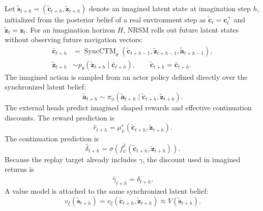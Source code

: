 \documentclass{article}
\begin{document}
Let $\tilde{\mathbf s}_{t+h}=(\tilde{\mathbf c}_{t+h},\tilde{\mathbf z}_{t+h})$ denote an imagined latent state at imagination step $h$, initialized from the posterior belief of a real environment step as $\tilde{\mathbf c}_{t}=\mathbf c_t^+$ and $\tilde{\mathbf z}_{t}=\mathbf z_t$. For an imagination horizon $H$, NRSM rolls out future latent states without observing future navigation vectors:
\begin{align}
\bar{\mathbf c}_{t+h}
&=
\operatorname{SyncCTM}_{\theta}(
\tilde{\mathbf c}_{t+h-1},
\tilde{\mathbf z}_{t+h-1},
\tilde{\mathbf a}_{t+h-1}),
\label{eq:imagined_context}\\
\tilde{\mathbf z}_{t+h}
&\sim
p_{\theta}(\tilde{\mathbf z}_{t+h}\mid\bar{\mathbf c}_{t+h}),
\qquad
\tilde{\mathbf c}_{t+h}=\bar{\mathbf c}_{t+h}.
\label{eq:imagined_latent}
\end{align}
The imagined action is sampled from an actor policy defined directly over the synchronized latent belief:
\begin{equation}
\tilde{\mathbf a}_{t+h}
\sim
\pi_{\phi}(
\tilde{\mathbf a}_{t+h}
\mid
\tilde{\mathbf c}_{t+h},\tilde{\mathbf z}_{t+h}).
\label{eq:imagined_actor}
\end{equation}
The external heads predict imagined shaped rewards and effective continuation discounts. The reward prediction is
\begin{equation}
\hat r_{t+h}=\mu_{\psi}^{r}(\tilde{\mathbf c}_{t+h},\tilde{\mathbf z}_{t+h}).
\label{eq:imagined_reward}
\end{equation}
The continuation prediction is
\begin{equation}
\hat\delta_{t+h}=\sigma\!\left(
f_{\psi}^{\delta}(\tilde{\mathbf c}_{t+h},\tilde{\mathbf z}_{t+h})\right).
\label{eq:imagined_termination}
\end{equation}
Because the replay target already includes $\gamma$, the discount used in imagined returns is
\begin{equation}
\hat\gamma_{t+h}=\hat\delta_{t+h}.
\label{eq:imagined_discount}
\end{equation}
A value model is attached to the same synchronized latent belief:
\begin{equation}
v_{\xi}(\tilde{\mathbf s}_{t+h})
=
v_{\xi}(\tilde{\mathbf c}_{t+h},\tilde{\mathbf z}_{t+h})
\approx
V(\tilde{\mathbf s}_{t+h}).
\label{eq:value_model}
\end{equation}
\end{document}
